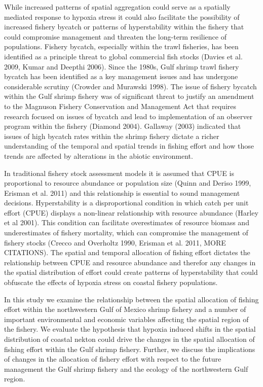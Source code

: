 \documentclass[10pt]{article}
\begin{document}
While increased patterns of spatial aggregation could serve as a spatially mediated response to hypoxia stress it could also facilitate the possibility of increased fishery bycatch or patterns of hyperstability within the fishery that could compromise management and threaten the long-term resilience of populations.  Fishery bycatch, especially within the trawl fisheries, has been identified as a principle threat to global commercial fish stocks (Davies et al. 2009, Kumar and Deepthi 2006).  Since the 1980s, Gulf shrimp trawl fishery bycatch has been identified as a key management issues and has undergone considerable scrutiny (Crowder and Murawski 1998).  The issue of fishery bycatch within the Gulf shrimp fishery was of significant threat to justify an amendment to the Magnuson Fishery Conservation and Management Act that requires research focused on issues of bycatch and lead to implementation of an observer program within the fishery (Diamond 2004).  Gallaway (2003) indicated that issues of high bycatch rates within the shrimp fishery dictate a richer understanding of the temporal and spatial trends in fishing effort and how those trends are affected by alterations in the abiotic environment.  

In traditional fishery stock assessment models it is assumed that CPUE is proportional to resource abundance or population size (Quinn and Deriso 1999, Erisman et al. 2011) and this relationship is essential to sound management decisions.  Hyperstability is a disproportional condition in which catch per unit effort (CPUE) displays a non-linear relationship with resource abundance (Harley et al 2001).  This condition can facilitate overestimates of resource biomass and underestimates of fishery mortality, which can compromise the management of fishery stocks (Crecco and Overholtz 1990, Erisman et al. 2011, MORE CITATIONS).  The spatial and temporal allocation of fishing effort dictates the relationship between CPUE and resource abundance and therefor any changes in the spatial distribution of effort could create patterns of hyperstability that could obfuscate the effects of hypoxia stress on coastal fishery populations.  

In this study we examine the relationship between the spatial allocation of fishing effort within the northwestern Gulf of Mexico shrimp fishery and a number of important environmental and economic variables affecting the spatial region of the fishery.  We evaluate the hypothesis that hypoxia induced shifts in the spatial distribution of coastal nekton could drive the changes in the spatial allocation of fishing effort within the Gulf shrimp fishery.  Further, we discuss the implications of changes in the allocation of fishery effort with respect to the future management the Gulf shrimp fishery and the ecology of the northwestern Gulf region.  
\end{document}
